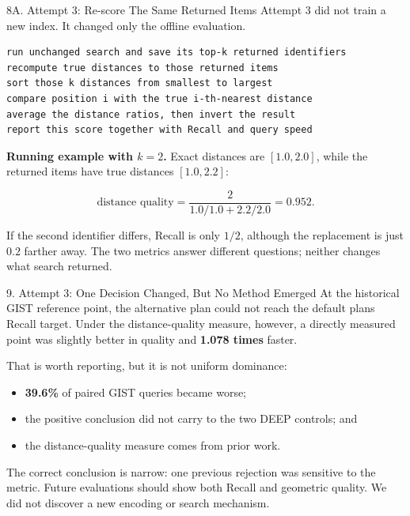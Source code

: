 \documentclass[
  ignorenonframetext,
  aspectratio=169,
]{beamer}
\providecommand{\tightlist}{%
  \setlength{\itemsep}{0pt}\setlength{\parskip}{0pt}}
\begin{document}
\begin{frame}[fragile]{8A. Attempt 3: Re-score The Same Returned Items}
\small
Attempt 3 did not train a new index. It changed only the offline evaluation.

\begin{verbatim}
run unchanged search and save its top-k returned identifiers
recompute true distances to those returned items
sort those k distances from smallest to largest
compare position i with the true i-th-nearest distance
average the distance ratios, then invert the result
report this score together with Recall and query speed
\end{verbatim}

\textbf{Running example with $k=2$.} Exact distances are $[1.0,2.0]$,
while the returned items have true distances $[1.0,2.2]$:

\[
\text{distance quality}=\frac{2}{1.0/1.0+2.2/2.0}=0.952.
\]

If the second identifier differs, Recall is only $1/2$, although the
replacement is just $0.2$ farther away. The two metrics answer different
questions; neither changes what search returned.
\end{frame}

\begin{frame}{9. Attempt 3: One Decision Changed, But No Method Emerged}
\protect{}\label{9-attempt-3-one-decision-changed-but-no-method-emerged}
At the historical GIST reference point, the alternative plan could not
reach the default plan\textquotesingle s Recall target. Under the
distance-quality measure, however, a directly measured point was
slightly better in quality and \textbf{1.078 times} faster.

That is worth reporting, but it is not uniform dominance:

\begin{itemize}
\tightlist
\item
  \textbf{39.6\%} of paired GIST queries became worse;
\item
  the positive conclusion did not carry to the two DEEP controls; and
\item
  the distance-quality measure comes from prior work.
\end{itemize}

The correct conclusion is narrow: one previous rejection was sensitive
to the metric. Future evaluations should show both Recall and geometric
quality. We did not discover a new encoding or search mechanism.
\end{frame}
\end{document}
